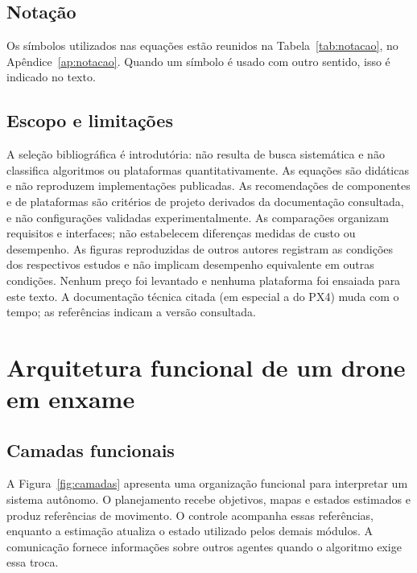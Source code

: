 \documentclass[11pt,a4paper,oneside]{book}
\numberwithin{equation}{chapter}
\begin{document}
\section{Notação}
Os símbolos utilizados nas equações estão reunidos na Tabela~\ref{tab:notacao}, no Apêndice~\ref{ap:notacao}. Quando um símbolo é usado com outro sentido, isso é indicado no texto.

\section{Escopo e limitações}\label{sec:escopo}
A seleção bibliográfica é introdutória: não resulta de busca sistemática e não classifica algoritmos ou plataformas quantitativamente. As equações são didáticas e não reproduzem implementações publicadas. As recomendações de componentes e de plataformas são critérios de projeto derivados da documentação consultada, e não configurações validadas experimentalmente. As comparações organizam requisitos e interfaces; não estabelecem diferenças medidas de custo ou desempenho. As figuras reproduzidas de outros autores registram as condições dos respectivos estudos e não implicam desempenho equivalente em outras condições. Nenhum preço foi levantado e nenhuma plataforma foi ensaiada para este texto. A documentação técnica citada (em especial a do PX4) muda com o tempo; as referências indicam a versão consultada.

\chapter{Arquitetura funcional de um drone em enxame}\label{cap:arq}
\section{Camadas funcionais}
A Figura~\ref{fig:camadas} apresenta uma organização funcional para interpretar um sistema autônomo. O planejamento recebe objetivos, mapas e estados estimados e produz referências de movimento. O controle acompanha essas referências, enquanto a estimação atualiza o estado utilizado pelos demais módulos. A comunicação fornece informações sobre outros agentes quando o algoritmo exige essa troca.
\end{document}

